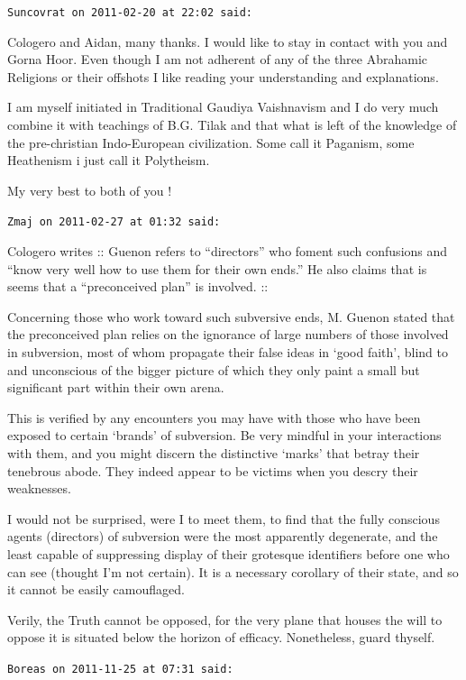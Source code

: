 \begin{footnotesize}
\begin{sffamily}
\hfill

\texttt{Suncovrat on 2011-02-20 at 22:02 said:}

Cologero and Aidan, many thanks. I would like to stay in contact with you and Gorna Hoor. Even though I am not adherent of any of the three Abrahamic Religions or their offshots I like reading your understanding and explanations.

I am myself initiated in Traditional Gaudiya Vaishnavism and I do very much combine it with teachings of B.G. Tilak and that what is left of the knowledge of the pre-christian Indo-European civilization. Some call it Paganism, some Heathenism i just call it Polytheism.

My very best to both of you !

\hfill

\texttt{Zmaj on 2011-02-27 at 01:32 said:}

Cologero writes :: Guenon refers to ``directors'' who foment such confusions and ``know very well how to use them for their own ends.'' He also claims that is seems that a ``preconceived plan'' is involved. ::

Concerning those who work toward such subversive ends, M. Guenon stated that the preconceived plan relies on the ignorance of large numbers of those involved in subversion, most of whom propagate their false ideas in `good faith', blind to and unconscious of the bigger picture of which they only paint a small but significant part within their own arena.

This is verified by any encounters you may have with those who have been exposed to certain `brands' of subversion. Be very mindful in your interactions with them, and you might discern the distinctive `marks' that betray their tenebrous abode. They indeed appear to be victims when you descry their weaknesses.

I would not be surprised, were I to meet them, to find that the fully conscious agents (directors) of subversion were the most apparently degenerate, and the least capable of suppressing display of their grotesque identifiers before one who can see (thought I'm not certain). It is a necessary corollary of their state, and so it cannot be easily camouflaged.

Verily, the Truth cannot be opposed, for the very plane that houses the will to oppose it is situated below the horizon of efficacy. Nonetheless, guard thyself.

\hfill

\texttt{Boreas on 2011-11-25 at 07:31 said:}


\end{sffamily}
\end{footnotesize}
